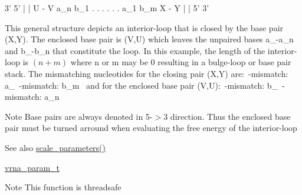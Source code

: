 \begin{DoxyPre}
      3'  5'
      |   |
      U - V
  a\_n       b\_1
   .        .
   .        .
   .        .
  a\_1       b\_m
      X - Y
      |   |
      5'  3'
\end{DoxyPre}
 This general structure depicts an interior-\/loop that is closed by the base pair (X,Y). The enclosed base pair is (V,U) which leaves the unpaired bases a\+\_-\/a\+\_\+n and b\+\_-\/b\+\_\+n that constitute the loop. In this example, the length of the interior-\/loop is $(n+m)$ where n or m may be 0 resulting in a bulge-\/loop or base pair stack. The mismatching nucleotides for the closing pair (X,Y) are\+:~\textquotesingle{}-\/mismatch\+: a\+\_~\textquotesingle{}-\/mismatch\+: b\+\_\+m~\newline
 and for the enclosed base pair (V,U)\+:~\textquotesingle{}-\/mismatch\+: b\+\_~\textquotesingle{}-\/mismatch\+: a\+\_\+n~\newline
 \begin{DoxyNote}{Note}
Base pairs are always denoted in 5\textquotesingle{}-\/$>$3\textquotesingle{} direction. Thus the enclosed base pair must be \textquotesingle{}turned arround\textquotesingle{} when evaluating the free energy of the interior-\/loop 
\end{DoxyNote}
\begin{DoxySeeAlso}{See also}
\mbox{\hyperlink{group__energy__parameters_ga541f2cf7436e9bc939b0a49b24baf987}{scale\+\_\+parameters()}} 

\mbox{\hyperlink{group__energy__parameters_ga8a69ca7d787e4fd6079914f5343a1f35}{vrna\+\_\+param\+\_\+t}} 
\end{DoxySeeAlso}
\begin{DoxyNote}{Note}
This function is threadsafe
\end{DoxyNote}

